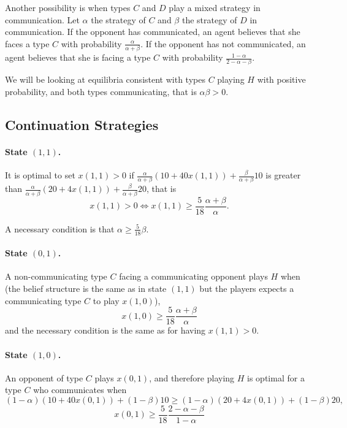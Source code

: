 \documentclass[12pt]{article}
\begin{document}
Another possibility is when types $C$ and $D$ play a mixed strategy in communication. Let $\alpha$ the strategy of $C$ and $\beta$ the strategy of $D$ in communication. If the opponent has communicated, an agent believes that she faces a type $C$ with probability $\frac{\alpha}{\alpha+\beta}$. If the opponent has not communicated, an agent believes that she is facing a type $C$ with probability $\frac{1-\alpha}{2-\alpha-\beta}$.

We will be looking at equilibria consistent with types $C$ playing $H$ with positive probability, and both types communicating, that is $\alpha\beta>0$. 

\subsection{Continuation Strategies}

\paragraph{State $(1,1)$.} It is optimal to set $x(1,1)>0$ if $\frac{\alpha}{\alpha+\beta}(10+40x(1,1))+\frac{\beta}{\alpha+\beta}10$ is greater than $\frac{\alpha}{\alpha+\beta}(20+4x(1,1))+\frac{\beta}{\alpha+\beta}20$, that is 
\begin{equation}\label{CWC-BR11}
	x(1,1)>0 \Leftrightarrow x(1,1)\geq \frac{5}{18}\frac{\alpha+\beta}{\alpha}.
\end{equation}

A necessary condition is that $\alpha\geq \frac{5}{18}\beta$.

\paragraph{State $(0,1)$.} A non-communicating type $C$ facing a communicating opponent plays $H$ when (the belief structure is the same as in state $(1,1)$ but the players expects a communicating type $C$ to play $x(1,0)$),
\begin{equation}\label{CWC-BR01}
	x(1,0)\geq \frac{5}{18}\frac{\alpha+\beta}{\alpha}
\end{equation}
%
and the necessary condition is the same as for having $x(1,1)>0$.

\paragraph{State $(1,0)$.} An opponent of type $C$ plays $x(0,1)$, and therefore playing $H$ is optimal for a type $C$ who communicates when
\[
(1-\alpha)(10+40x(0,1))+(1-\beta) 10 \geq (1-\alpha)(20+4x(0,1))+(1-\beta) 20,
\]
\begin{equation}\label{CWC-BR10}
	x(0,1)\geq \frac{5}{18}\frac{2-\alpha-\beta}{1-\alpha}
\end{equation}
\end{document}
